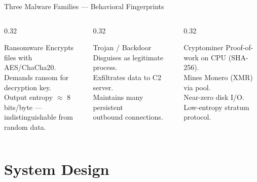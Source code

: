 \documentclass[aspectratio=169,12pt]{beamer}
\begin{document}
\begin{frame}{Three Malware Families — Behavioral Fingerprints}
  \vspace{0.4em}
  \begin{columns}[T]
    \begin{column}{0.32\textwidth}
      \begin{alertblock}{\small Ransomware}
        \scriptsize
        Encrypts files with AES/ChaCha20.\\
        Demands ransom for decryption key.\\
        Output entropy $\approx$ 8\,bits/byte —\\
        indistinguishable from random data.
      \end{alertblock}
    \end{column}
    \begin{column}{0.32\textwidth}
      \begin{block}{\small Trojan / Backdoor}
        \scriptsize
        Disguises as legitimate process.\\
        Exfiltrates data to C2 server.\\
        Maintains many persistent\\
        outbound connections.
      \end{block}
    \end{column}
    \begin{column}{0.32\textwidth}
      \begin{block}{\small Cryptominer}
        \scriptsize
        Proof-of-work on CPU (SHA-256).\\
        Mines Monero (XMR) via pool.\\
        Near-zero disk I/O.\\
        Low-entropy stratum protocol.
      \end{block}
    \end{column}
  \end{columns}
\end{frame}

\section{System Design}
\end{document}
